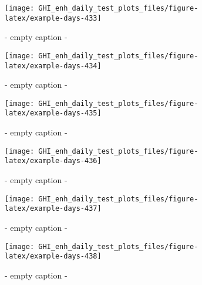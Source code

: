 \documentclass[
  10pt,
  a4paper,oneside]{article}
\begin{document}
\begin{figure}[H]

{\centering \texttt{[image: GHI\_enh\_daily\_test\_plots\_files/figure-latex/example-days-433]} 

}

\caption{ - empty caption - }\label{fig:example-days-433}
\end{figure}

\begin{figure}[H]

{\centering \texttt{[image: GHI\_enh\_daily\_test\_plots\_files/figure-latex/example-days-434]} 

}

\caption{ - empty caption - }\label{fig:example-days-434}
\end{figure}

\begin{figure}[H]

{\centering \texttt{[image: GHI\_enh\_daily\_test\_plots\_files/figure-latex/example-days-435]} 

}

\caption{ - empty caption - }\label{fig:example-days-435}
\end{figure}

\begin{figure}[H]

{\centering \texttt{[image: GHI\_enh\_daily\_test\_plots\_files/figure-latex/example-days-436]} 

}

\caption{ - empty caption - }\label{fig:example-days-436}
\end{figure}

\begin{figure}[H]

{\centering \texttt{[image: GHI\_enh\_daily\_test\_plots\_files/figure-latex/example-days-437]} 

}

\caption{ - empty caption - }\label{fig:example-days-437}
\end{figure}

\begin{figure}[H]

{\centering \texttt{[image: GHI\_enh\_daily\_test\_plots\_files/figure-latex/example-days-438]} 

}

\caption{ - empty caption - }\label{fig:example-days-438}
\end{figure}
\end{document}
